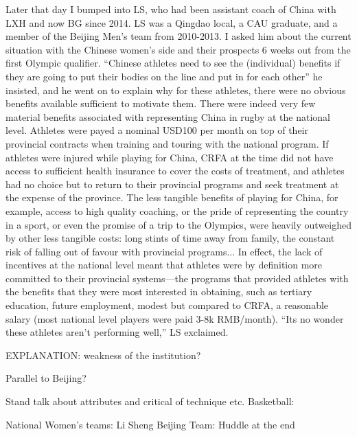Later that day I bumped into LS, who had been assistant coach of China with LXH and now BG since 2014.  LS was a Qingdao local, a CAU graduate, and a member of the Beijing Men's team from 2010-2013.  I asked him about the current situation with the Chinese women's side and their prospects 6 weeks out from the first Olympic qualifier.  ``Chinese athletes need to see the (individual) benefits if they are going to put their bodies on the line and put in for each other'' he insisted, and he went on to explain why for these athletes, there were no obvious benefits available sufficient to motivate them.  There were indeed very few material benefits associated with representing China in rugby at the national level.  Athletes were payed a nominal USD100 per month on top of their provincial contracts when training and touring with the national program.  If athletes were injured while playing for China, CRFA at the time did not have access to sufficient health insurance to cover the costs of treatment, and athletes had no choice but to return to their provincial programs and seek treatment at the expense of the province.  The less tangible benefits of playing for China, for example, access to high quality coaching, or the pride of representing the country in a sport, or even the promise of a trip to the Olympics, were heavily outweighed by other less tangible costs: long stints of time away from family, the constant risk of falling out of favour with provincial programs...  In effect, the lack of incentives at the national level meant that athletes were by definition more committed to their provincial systems---the programs that provided athletes with the benefits that they were most interested in obtaining, such as tertiary education, future employment, modest but compared to CRFA, a reasonable salary (most national level players were paid 3-8k RMB/month). ``Its no wonder these athletes aren't performing well,'' LS exclaimed.

EXPLANATION: weakness of the institution?

Parallel to Beijing?


Stand talk about attributes and critical of technique etc.
Basketball:



National Women's teams: Li Sheng
Beijing Team: Huddle at the end
















